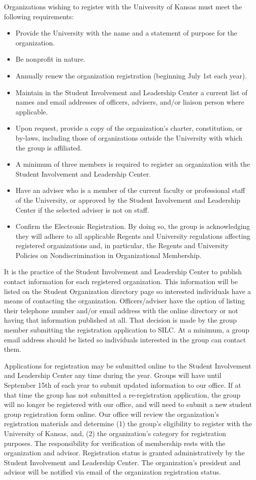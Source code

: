 Organizations wishing to register with the University of Kansas must meet the following requirements:
\begin{itemize}
	\item Provide the University with the name and a statement of purpose for the organization.
	\item Be nonprofit in nature.
	\item Annually renew the organization registration (beginning July 1st each year).
	\item Maintain in the Student Involvement and Leadership Center a current list of names and email addresses of officers, advisers, and/or liaison person where applicable.
	\item Upon request, provide a copy of the organization's charter, constitution, or by-laws, including those of organizations outside the University with which the group is affiliated.
	\item A minimum of three members is required to register an organization with the Student Involvement and Leadership Center.
	\item Have an adviser who is a member of the current faculty or professional staff of the University, or approved by the Student Involvement and Leadership Center if the selected adviser is not on staff.
	\item Confirm the Electronic Registration. By doing so, the group is acknowledging they will adhere to all applicable Regents and University regulations affecting registered organizations and, in particular, the Regents and University Policies on Nondiscrimination in Organizational Membership.
\end{itemize}
It is the practice of the Student Involvement and Leadership Center to publish contact information for each registered organization. This information will be listed on the Student Organization directory page so interested individuals have a means of contacting the organization. Officers/adviser have the option of listing their telephone number and/or email address with the online directory or not having that information published at all. That decision is made by the group member submitting the registration application to SILC. At a minimum, a group email address should be listed so individuals interested in the group can contact them.

Applications for registration may be submitted online to the Student Involvement and Leadership Center any time during the year. Groups will have until September 15th of each year to submit updated information to our office. If at that time the group has not submitted a re-registration application, the group will no longer be registered with our office, and will need to submit a new student group registration form online. Our office will review the organization's registration materials and determine (1) the group's eligibility to register with the University of Kansas, and, (2) the organization's category for registration purposes. The responsibility for verification of membership rests with the organization and advisor. Registration status is granted administratively by the Student Involvement and Leadership Center. The organization's president and advisor will be notified via email of the organization registration status.

